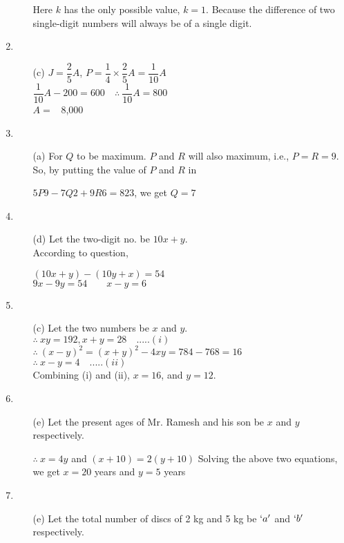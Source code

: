 \begin{multicols}{2}
\begin{enumerate}
\begin{itemize}
    Here $k$ has the only possible value, $k = 1$. Because the difference of two single-digit numbers will always be of a single digit.
  \end{itemize}
\item
  \begin{itemize}
  \item[(c)] $J = \dfrac{2}{5}A$, $P = \dfrac{1}{4} \times \dfrac{2}{5}A = \dfrac{1}{10}A$\\
    $\dfrac{1}{10}A - 200 = 600 \quad\therefore~ \dfrac{1}{10}A = 800$\\
    $A =$ \rupee~8,000
  \end{itemize}
\item
  \begin{itemize}
  \item[(a)] For $Q$ to be maximum. $P$ and $R$ will also maximum, i.e., $P = R = 9$.\\
    So, by putting the value of $P$ and $R$ in

    $5P9 - 7Q2 + 9R6 = 823$, we get $Q = 7$
  \end{itemize}
\item
  \begin{itemize}
  \item[(d)] Let the two-digit no. be $10x + y$.\\
    According to question,

    $(10x + y)-(10y + x) = 54$\\
    $9x - 9y = 54 \qquad x - y = 6$
  \end{itemize}
\item
  \begin{itemize}
  \item[(c)] Let the two numbers be $x$ and $y$.\\
    $\therefore~ xy = 192, x + y = 28 \quad .....(i)$\\
    $\therefore~ (x - y)^2 = (x + y)^2 - 4xy = 784 - 768 = 16$\\
    $\therefore~ x - y = 4 \quad .....(ii)$\\
    Combining (i) and (ii), $x = 16$, and $y = 12$.
  \end{itemize}
\item
  \begin{itemize}
  \item[(e)] Let the present ages of Mr. Ramesh and his son be $x$ and $y$ respectively.

    $\therefore~ x = 4y$ and $(x + 10) = 2(y + 10)$ Solving the above two equations, we get $x = 20$ years and $y = 5$ years
  \end{itemize}
\item
  \begin{itemize}
  \item[(e)] Let the total number of discs of 2 kg and 5 kg be $`a'$ and $`b'$ respectively.


\end{itemize}
\end{enumerate}
\end{multicols}

